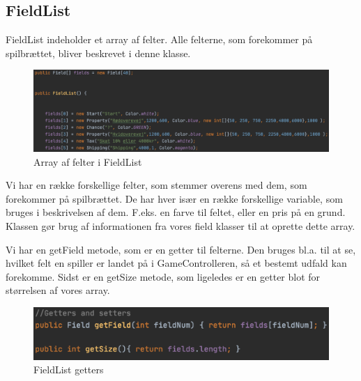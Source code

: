 \subsection{FieldList}

FieldList indeholder et array af felter. Alle felterne, som forekommer på spilbrættet, bliver beskrevet i denne klasse.
\begin{figure}[H]
    \centering
    \includegraphics[width=\textwidth]{sources/7_implementering/FieldList FieldList.png}
    \caption{Array af felter i FieldList}
    \label{fig:FieldListArray}
\end{figure}
Vi har en række forskellige felter, som stemmer overens med dem, som forekommer på spilbrættet. De har hver især en række forskellige variable, som bruges i beskrivelsen af dem. F.eks. en farve til feltet, eller en pris på en grund.
Klassen gør brug af informationen fra vores field klasser til at oprette dette array.


Vi har en getField metode, som er en getter til felterne. Den bruges bl.a. til at se, hvilket felt en spiller er landet på i GameControlleren, så et bestemt udfald kan forekomme.
Sidst er en getSize metode, som ligeledes er en getter blot for størrelsen af vores array.
\begin{figure}[H]
    \centering
    \includegraphics[width=\textwidth]{sources/7_implementering/FieldList Getters}
    \caption{FieldList getters}
    \label{fig:FieldList Getters}
\end{figure}